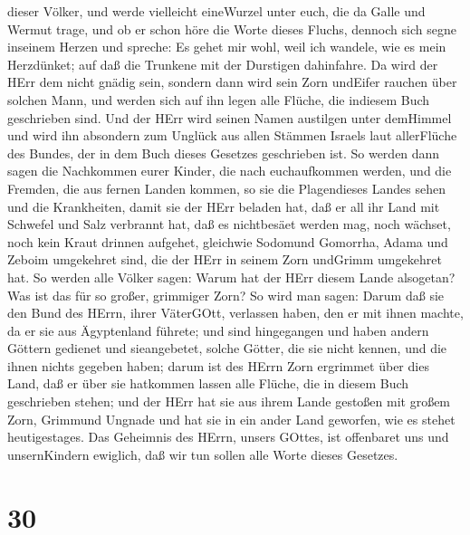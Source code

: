 dieser Völker, und werde vielleicht eineWurzel unter euch, die da Galle
und Wermut trage,  und ob er schon höre die Worte dieses
Fluchs, dennoch sich segne inseinem Herzen und spreche: Es gehet mir
wohl, weil ich wandele, wie es mein Herzdünket; auf daß die Trunkene mit
der Durstigen dahinfahre.  Da wird der HErr dem nicht
gnädig sein, sondern dann wird sein Zorn undEifer rauchen über solchen
Mann, und werden sich auf ihn legen alle Flüche, die indiesem Buch
geschrieben sind. Und der HErr wird seinen Namen austilgen unter
demHimmel  und wird ihn absondern zum Unglück aus allen
Stämmen Israels laut allerFlüche des Bundes, der in dem Buch dieses
Gesetzes geschrieben ist.  So werden dann sagen die
Nachkommen eurer Kinder, die nach euchaufkommen werden, und die Fremden,
die aus fernen Landen kommen, so sie die Plagendieses Landes sehen und
die Krankheiten, damit sie der HErr beladen hat,  daß er
all ihr Land mit Schwefel und Salz verbrannt hat, daß es nichtbesäet
werden mag, noch wächset, noch kein Kraut drinnen aufgehet, gleichwie
Sodomund Gomorrha, Adama und Zeboim umgekehret sind, die der HErr in
seinem Zorn undGrimm umgekehret hat.  So werden alle Völker
sagen: Warum hat der HErr diesem Lande alsogetan? Was ist das für so
großer, grimmiger Zorn?  So wird man sagen: Darum daß sie
den Bund des HErrn, ihrer VäterGOtt, verlassen haben, den er mit ihnen
machte, da er sie aus Ägyptenland führete;  und sind
hingegangen und haben andern Göttern gedienet und sieangebetet, solche
Götter, die sie nicht kennen, und die ihnen nichts gegeben haben;
 darum ist des HErrn Zorn ergrimmet über dies Land, daß er
über sie hatkommen lassen alle Flüche, die in diesem Buch geschrieben
stehen;  und der HErr hat sie aus ihrem Lande gestoßen mit
großem Zorn, Grimmund Ungnade und hat sie in ein ander Land geworfen,
wie es stehet heutigestages.  Das Geheimnis des HErrn,
unsers GOttes, ist offenbaret uns und unsernKindern ewiglich, daß wir
tun sollen alle Worte dieses Gesetzes.

\hypertarget{section-29}{%
\section{30}\label{section-29}}

